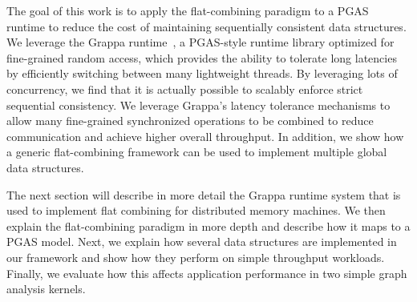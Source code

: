 
The goal of this work is to apply the flat-combining paradigm to a PGAS runtime to reduce the cost of maintaining sequentially consistent data structures.
We leverage the Grappa runtime~\cite{Nelson:hotpar11-real}, a PGAS-style runtime library optimized for fine-grained random access, which provides the ability to tolerate long latencies by efficiently switching between many lightweight threads.
By leveraging lots of concurrency, we find that it is actually possible to scalably enforce strict sequential consistency. We leverage Grappa's latency tolerance mechanisms to allow many fine-grained synchronized operations to be combined to reduce communication and achieve higher overall throughput.
In addition, we show how a generic flat-combining framework can be used to implement multiple global data structures.

The next section will describe in more detail the Grappa runtime system that is used to implement flat combining for distributed memory machines. We then explain the flat-combining paradigm in more depth and describe how it maps to a PGAS model. Next, we explain how several data structures are implemented in our framework and show how they perform on simple throughput workloads. Finally, we evaluate how this affects application performance in two simple graph analysis kernels.
